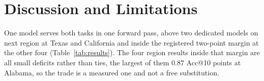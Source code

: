 %
%
\section{Discussion and Limitations}
\label{sec:discussion}

One model serves both tasks in one forward pass, above two dedicated models on next region at Texas
and California and inside the registered two-point margin at the other four
(Table~\ref{tab:results}). The four region results inside that margin are all small deficits rather than ties,
the largest of them $0.87$ Acc@10 points at Alabama, so the trade is a measured one and not a free
substitution.

